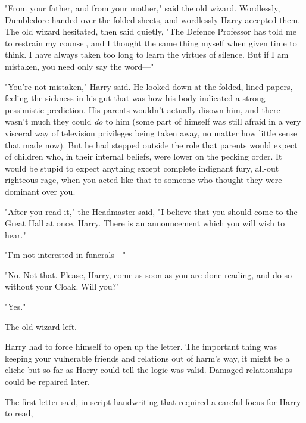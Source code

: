 "From your father, and from your mother," said the old wizard. Wordlessly,
Dumbledore handed over the folded sheets, and wordlessly Harry accepted them.
The old wizard hesitated, then said quietly, "The Defence Professor has told me
to restrain my counsel, and I thought the same thing myself when given time to
think. I have always taken too long to learn the virtues of silence. But if I
am mistaken, you need only say the word---"

"You're not mistaken," Harry said. He looked down at the folded, lined papers,
feeling the sickness in his gut that was how his body indicated a strong
pessimistic prediction. His parents wouldn't actually disown him, and there
wasn't much they could \emph{do} to him (some part of himself was still afraid
in a very visceral way of television privileges being taken away, no matter how
little sense that made now). But he had stepped outside the role that parents
would expect of children who, in their internal beliefs, were lower on the
pecking order. It would be stupid to expect anything except complete indignant
fury, all-out righteous rage, when you acted like that to someone who thought
they were dominant over you.

"After you read it," the Headmaster said, "I believe that you should come to
the Great Hall at once, Harry. There is an announcement which you will wish to
hear."

"I'm not interested in funerals---"

"No. Not that. Please, Harry, come as soon as you are done reading, and do so
without your Cloak. Will you?"

"Yes."

The old wizard left.

Harry had to force himself to open up the letter. The important thing was
keeping your vulnerable friends and relations out of harm's way, it might be a
cliche but so far as Harry could tell the logic was valid. Damaged
relationships could be repaired later.

The first letter said, in script handwriting that required a careful focus for
Harry to read,

